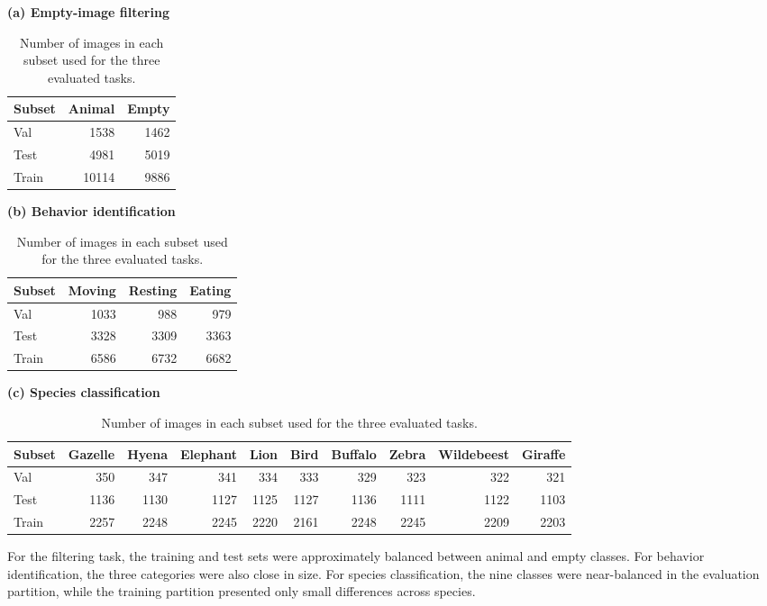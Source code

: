 \begin{table}[htbp]
\centering
\caption{Number of images in each subset used for the three evaluated tasks.}
\label{tab:dataset_sizes}

\vspace{0.5em}
\textbf{(a) Empty-image filtering}\\[0.3em]
\begin{tabular}{lrr}
\hline
Subset & Animal & Empty \\
\hline
Val & 1538 & 1462 \\
Test & 4981 & 5019 \\
Train & 10114 & 9886 \\
\hline
\end{tabular}

\vspace{1em}
\textbf{(b) Behavior identification}\\[0.3em]
\begin{tabular}{lrrr}
\hline
Subset & Moving & Resting & Eating \\
\hline
Val & 1033 & 988 & 979 \\
Test & 3328 & 3309 & 3363 \\
Train & 6586 & 6732 & 6682 \\
\hline
\end{tabular}

\vspace{1em}
\textbf{(c) Species classification}\\[0.3em]
\begin{tabular}{lrrrrrrrrr}
\hline
Subset & Gazelle & Hyena & Elephant & Lion & Bird & Buffalo & Zebra & Wildebeest & Giraffe \\
\hline
Val & 350 & 347 & 341 & 334 & 333 & 329 & 323 & 322 & 321 \\
Test & 1136 & 1130 & 1127 & 1125 & 1127 & 1136 & 1111 & 1122 & 1103 \\
Train & 2257 & 2248 & 2245 & 2220 & 2161 & 2248 & 2245 & 2209 & 2203 \\
\hline
\end{tabular}
\end{table}

For the filtering task, the training and test sets were approximately balanced between animal and empty classes. For behavior identification, the three categories were also close in size. For species classification, the nine classes were near-balanced in the evaluation partition, while the training partition presented only small differences across species.

